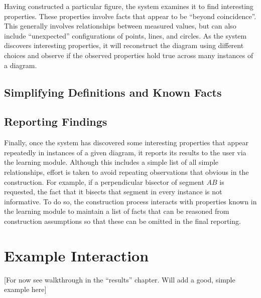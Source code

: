 Having constructed a particular figure, the system examines it to find
interesting properties.  These properties involve facts that appear to
be ``beyond coincidence''.  This generally involves relationships
between measured values, but can also include ``unexpected''
configurations of points, lines, and circles.  As the system discovers
interesting properties, it will reconstruct the diagram using
different choices and observe if the observed properties hold true
across many instances of a diagram.

\subsection{Simplifying Definitions and Known Facts}

\subsection{Reporting Findings}

Finally, once the system has discovered some interesting properties
that appear repeatedly in instances of a given diagram, it reports its
results to the user via the learning module.  Although this includes a
simple list of all simple relationships, effort is taken to avoid
repeating observations that obvious in the construction.  For example,
if a perpendicular bisector of segment $AB$ is requested, the fact
that it bisects that segment in every instance is not informative.  To
do so, the construction process interacts with properties known in the
learning module to maintain a list of facts that can be reasoned from
construction assumptions so that these can be omitted in the final
reporting.

\section{Example Interaction}

[For now see walkthrough in the ``results'' chapter. Will add a good,
  simple example here]
